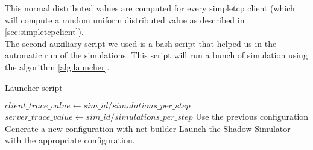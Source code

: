 This normal distributed values are computed for every simpletcp client
(which will compute a random uniform distributed value as described in \ref{sec:simpletcpclient}).\\

The second auxiliary script we used is a bash script that helped us in the
automatic run of the simulations.
This script will run a bunch of simulation using the algorithm \ref{alg:launcher}.

\begin{algorithm}[H]
\caption{Launcher script}
\begin{algorithmic}[2]
			\State $client\_trace\_value \gets sim\_id/simulations\_per\_step$
		\EndIf
			\State $server\_trace\_value \gets sim\_id/simulations\_per\_step$
		\EndIf
			\State Use the previous configuration
		\Else
			\State Generate a new configuration with net-builder
		\EndIf
		\State Launch the Shadow Simulator with the appropriate configuration.
		\EndFor
	\EndFor
\EndFor
\end{algorithmic}
\label{alg:launcher}
\end{algorithm}


